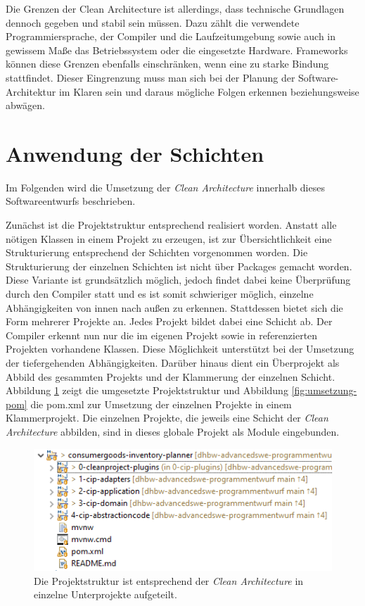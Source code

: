 Die Grenzen der Clean Architecture ist allerdings, dass technische Grundlagen dennoch gegeben und stabil sein müssen.
Dazu zählt die verwendete Programmiersprache, der Compiler und die Laufzeitumgebung sowie auch in gewissem Maße das Betriebssystem oder die eingesetzte Hardware.
Frameworks können diese Grenzen ebenfalls einschränken, wenn eine zu starke Bindung stattfindet.
Dieser Eingrenzung muss man sich bei der Planung der Software-Architektur im Klaren sein und daraus mögliche Folgen erkennen beziehungsweise abwägen.

\section{Anwendung der Schichten}
Im Folgenden wird die Umsetzung der \textit{Clean Architecture} innerhalb dieses Softwareentwurfs beschrieben.

Zunächst ist die Projektstruktur entsprechend realisiert worden.
Anstatt alle nötigen Klassen in einem Projekt zu erzeugen, ist zur Übersichtlichkeit eine Strukturierung entsprechend der Schichten vorgenommen worden.
Die Strukturierung der einzelnen Schichten ist nicht über Packages gemacht worden.
Diese Variante ist grundsätzlich möglich, jedoch findet dabei keine Überprüfung durch den Compiler statt und es ist somit schwieriger möglich, einzelne Abhängigkeiten von innen nach außen zu erkennen.
Stattdessen bietet sich die Form mehrerer Projekte an.
Jedes Projekt bildet dabei eine Schicht ab.
Der Compiler erkennt nun nur die im eigenen Projekt sowie in referenzierten Projekten vorhandene Klassen.
Diese Möglichkeit unterstützt bei der Umsetzung der tiefergehenden Abhängigkeiten.
Darüber hinaus dient ein Überprojekt als Abbild des gesammten Projekts und der Klammerung der einzelnen Schicht.
Abbildung \ref{fig:projektstruktur} zeigt die umgesetzte Projektstruktur und Abbildung \ref{fig:umsetzung-pom} die pom.xml zur Umsetzung der einzelnen Projekte in einem Klammerprojekt.
Die einzelnen Projekte, die jeweils eine Schicht der \textit{Clean Architecture} abbilden, sind in dieses globale Projekt als Module eingebunden.

\begin{figure}[H]
	\centering
	\includegraphics[width=1.0\textwidth]{Bilder/projektstruktur.PNG}
	\caption[Aufteilung der Projektstruktur entsprechend \textit{Clean Architecture}.]{Die Projektstruktur ist entsprechend der \textit{Clean Architecture} in einzelne Unterprojekte aufgeteilt.}
	\label{fig:projektstruktur}
\end{figure}

